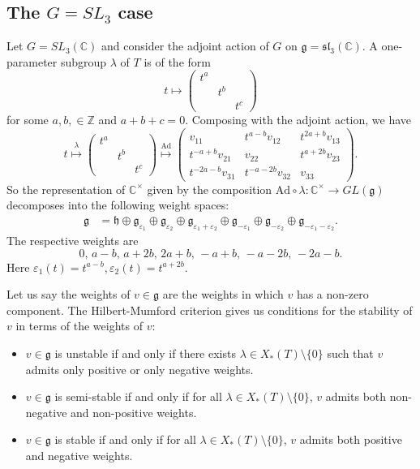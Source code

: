 \documentclass[12pt]{amsart}
\newcommand{\C}{\mathbb{C}}
\newcommand{\g}{\mathfrak{g}}
\newcommand{\h}{\mathfrak{h}}
\theoremstyle{remark}
\theoremstyle{remark}
\theoremstyle{remark}
\begin{document}
\subsection{The $G=SL_3$ case}
Let $G = SL_3(\C)$ and consider the adjoint action of $G$ on $\mathfrak{g} = \mathfrak{sl}_3(\C)$.
A one-parameter subgroup $\lambda$ of $T$ is of the form
$$t \mapsto \begin{pmatrix} t^a & & \\ & t^b & \\ & & t^c \end{pmatrix}$$
for some $a, b, \in \mathbb{Z}$ and $a + b + c = 0$.
Composing with the adjoint action, we have
$$t 
\overset{\lambda}{\mapsto} \begin{pmatrix} t^a & & \\ & t^b & \\ & & t^c \end{pmatrix}
 \overset{\mathrm{Ad}}{\mapsto} \begin{pmatrix} v_{11} & t^{a-b} v_{12} & t^{2a+b} v_{13} \\ t^{-a+b} v_{21} & v_{22} & t^{a+2b} v_{23} \\ t^{-2a-b} v_{31} & t^{-a-2b} v_{32} & v_{33} \end{pmatrix}.$$
So the representation of $\C^\times$ given by the composition $\mathrm{Ad} \circ \lambda: \C^\times \to GL(\mathfrak{g})$ decomposes into the following weight spaces:
\begin{align*}
	\g &= \h \oplus \g_{\varepsilon_1} \oplus \g_{\varepsilon_2} \oplus \g_{\varepsilon_1 + \varepsilon_2} \oplus \g_{-\varepsilon_1} \oplus \g_{-\varepsilon_2} \oplus \g_{-\varepsilon_1 - \varepsilon_2}. 
\end{align*}
The respective weights are
$$0, \, a-b, \, a+2b, \, 2a+b, \, -a+b, \, -a-2b, \,-2a-b.$$
Here $\varepsilon_1(t) = t^{a-b}, \varepsilon_2(t) = t^{a+2b}$.

Let us say the weights of $v \in \g$ are the weights in which $v$ has a non-zero component.
The Hilbert-Mumford criterion gives us conditions for the stability of $v$ in terms of the weights of $v$:
\begin{itemize}[label=-]
\item
$v \in \g$ is unstable if and only if there exists $\lambda \in X_*(T)\setminus\{0\}$ such that $v$ admits only positive or only negative weights.

\item
$v \in \g$ is semi-stable if and only if for all $\lambda \in X_*(T)\setminus\{0\}$, $v$ admits both non-negative and non-positive weights.

\item
$v \in \g$ is stable if and only if for all $\lambda \in X_*(T)\setminus\{0\}$, $v$ admits both positive and negative weights.
\end{itemize}
\end{document}
